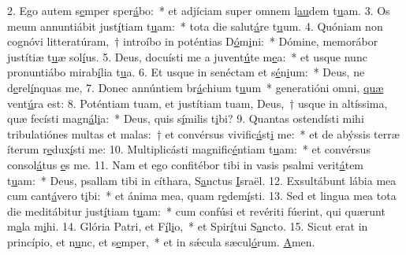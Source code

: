 2. Ego autem s\uline{e}mper sper\uline{á}bo:~* et adjíciam super omnem l\uline{au}dem t\uline{u}am.
3. Os meum annuntiábit just\uline{í}tiam t\uline{u}am:~* tota die salut\uline{á}re t\uline{u}um.
4. Quóniam non cognóvi litteratúram,~† introíbo in poténtias D\uline{ó}m\uline{i}ni:~* Dómine, memorábor justítiæ t\uline{u}æ sol\uline{í}us.
5. Deus, docuísti me a juvent\uline{ú}te m\uline{e}a:~* et usque nunc pronuntiábo mirab\uline{í}lia t\uline{u}a.
6. Et usque in senéctam et s\uline{é}n\uline{i}um:~* Deus, ne d\uline{e}rel\uline{í}nquas me,
7. Donec annúntiem br\uline{á}chium t\uline{u}um~* generatióni omni, \uline{quæ} vent\uline{ú}ra est:
8. Poténtiam tuam, et justítiam tuam, Deus,~† usque in altíssima, quæ fecísti magn\uline{á}l\uline{i}a:~* Deus, quis s\uline{í}milis t\uline{i}bi?
9. Quantas ostendísti mihi tribulatiónes multas et malas:~† et convérsus vivific\uline{á}st\uline{i} me:~* et de abýssis terræ íterum r\uline{e}dux\uline{í}sti me:
10. Multiplicásti magnific\uline{é}ntiam t\uline{u}am:~* et convérsus consol\uline{á}tus \uline{e}s me.
11. Nam et ego confitébor tibi in vasis psalmi verit\uline{á}tem t\uline{u}am:~* Deus, psallam tibi in cíthara, S\uline{a}nctus \uline{I}sraël.
12. Exsultábunt lábia mea cum cant\uline{á}vero t\uline{i}bi:~* et ánima mea, quam r\uline{e}dem\uline{í}sti.
13. Sed et lingua mea tota die meditábitur just\uline{í}tiam t\uline{u}am:~* cum confúsi et revériti fúerint, qui quærunt m\uline{a}la m\uline{i}hi.
14. Glória Patri, et F\uline{í}l\uline{i}o,~* et Spir\uline{í}tui S\uline{a}ncto.
15. Sicut erat in princípio, et n\uline{u}nc, et s\uline{e}mper,~* et in sǽcula sæcul\uline{ó}rum. \uline{A}men.
